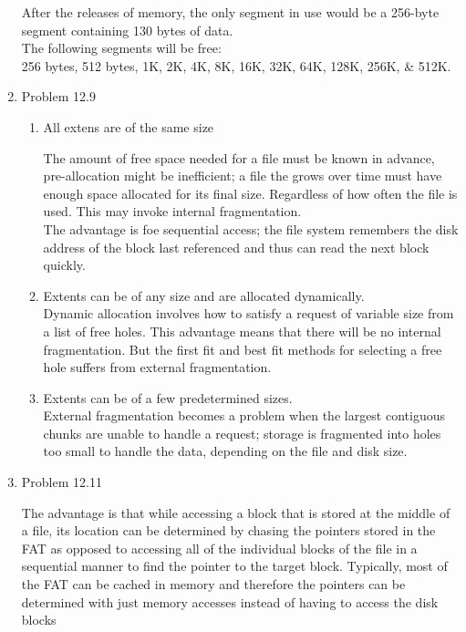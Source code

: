 \documentclass[a4paper,11pt]{article}
\theoremstyle{mytheor}
\begin{document}
\begin{enumerate}
    After the releases of memory, the only segment in use would be a 256-byte segment containing 130 bytes of data. \\
    The following segments will be free: \\
    256 bytes, 512 bytes, 1K, 2K, 4K, 8K, 16K, 32K, 64K, 128K, 256K, \& 512K.

    \pagebreak

\item{Problem 12.9} \par
    \begin{enumerate}
    \item All extens are of the same size \par 
        The amount of free space needed for a file must be known in advance, pre-allocation might be inefficient; a file the grows over time must have enough space allocated for its final size. Regardless of how often the file is used. This may invoke internal fragmentation. \\
        The advantage is foe sequential access; the file system remembers the disk address of the block last referenced and thus can read the next block quickly.
    \item Extents can be of any size and are allocated dynamically.\\
        Dynamic allocation involves how to satisfy a request of variable size from a list of free holes. This advantage means that there will be no internal fragmentation. But the first fit and best fit methods for selecting a free hole suffers from external fragmentation.
    \item Extents can be of a few predetermined sizes. \\
        External fragmentation becomes a problem when the largest contiguous chunks are unable to handle a request; storage is fragmented into holes too small to handle the data, depending on the file and disk size.
    \end{enumerate}
    
\item{Problem 12.11} \par
    The advantage is that while accessing a block that is stored at the middle of a file, its location can be determined by chasing the pointers stored in the FAT as opposed to accessing all of the individual blocks of the file in a sequential manner to find the pointer to the target block. Typically, most of the FAT can be cached in memory and therefore the pointers can be determined with just memory accesses instead of having to access the disk blocks 
    

\end{enumerate}
\end{document}
